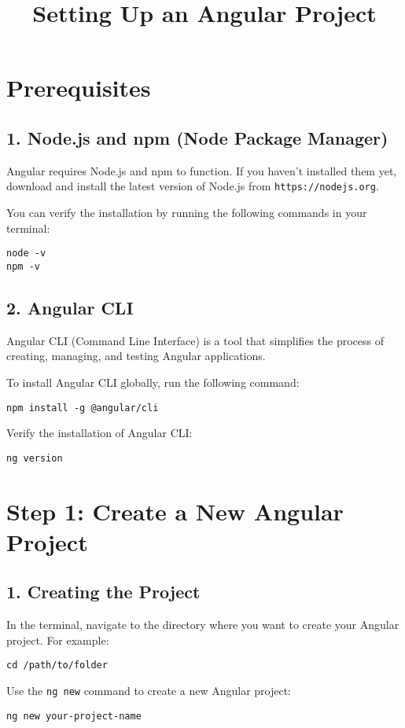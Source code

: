 \documentclass{article}
\title{Setting Up an Angular Project}
\author{}
\date{}
\begin{document}
\maketitle

\section*{Prerequisites}
\subsection*{1. Node.js and npm (Node Package Manager)}
Angular requires Node.js and npm to function. If you haven't installed them yet, download and install the latest version of Node.js from \texttt{https://nodejs.org}.

You can verify the installation by running the following commands in your terminal:
\begin{verbatim}
node -v
npm -v
\end{verbatim}

\subsection*{2. Angular CLI}
Angular CLI (Command Line Interface) is a tool that simplifies the process of creating, managing, and testing Angular applications.

To install Angular CLI globally, run the following command:
\begin{verbatim}
npm install -g @angular/cli
\end{verbatim}

Verify the installation of Angular CLI:
\begin{verbatim}
ng version
\end{verbatim}

\section*{Step 1: Create a New Angular Project}
\subsection*{1. Creating the Project}
In the terminal, navigate to the directory where you want to create your Angular project. For example:
\begin{verbatim}
cd /path/to/folder
\end{verbatim}

Use the \texttt{ng new} command to create a new Angular project:
\begin{verbatim}
ng new your-project-name
\end{verbatim}
\end{document}
